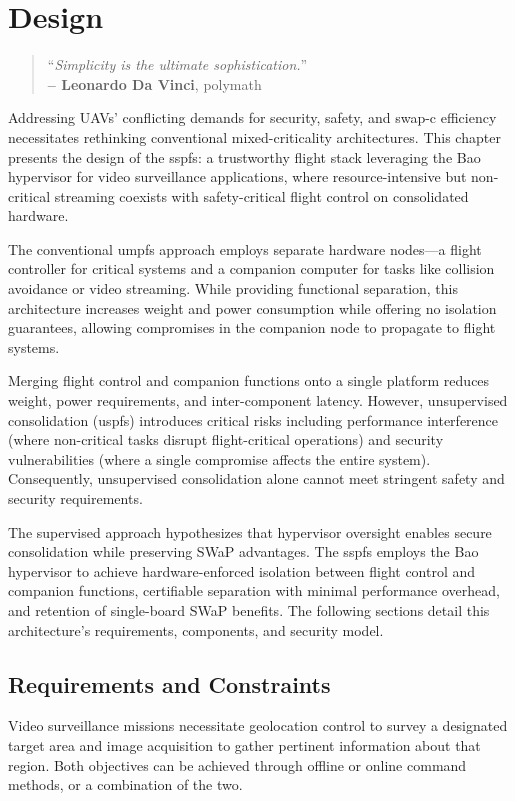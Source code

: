 %
\chapter{Design}%
\label{ch:design}
\begin{quote}
\begin{flushright}
``\emph{Simplicity is the ultimate sophistication.}'' \\
\textbf{-- Leonardo Da Vinci}, polymath
\end{flushright}
\end{quote}

Addressing UAVs' conflicting demands for security, safety, and \gls{swap-c} efficiency necessitates rethinking conventional mixed-criticality architectures. This chapter presents the design of the \gls{sspfs}: a trustworthy flight stack leveraging the Bao hypervisor for video surveillance applications, where resource-intensive but non-critical streaming coexists with safety-critical flight control on consolidated hardware.

The conventional \gls{umpfs} approach employs separate hardware nodes—a flight controller for critical systems and a companion computer for tasks like collision avoidance or video streaming. While providing functional separation, this architecture increases weight and power consumption while offering no isolation guarantees, allowing compromises in the companion node to propagate to flight systems.

Merging flight control and companion functions onto a single platform reduces weight, power requirements, and inter-component latency. However, unsupervised consolidation (\gls{uspfs}) introduces critical risks including performance interference (where non-critical tasks disrupt flight-critical operations) and security vulnerabilities (where a single compromise affects the entire system). Consequently, unsupervised consolidation alone cannot meet stringent safety and security requirements.

The supervised approach hypothesizes that hypervisor oversight enables secure consolidation while preserving SWaP advantages. The \gls{sspfs} employs the Bao hypervisor to achieve hardware-enforced isolation between flight control and companion functions, certifiable separation with minimal performance overhead, and retention of single-board SWaP benefits. The following sections detail this architecture's requirements, components, and security model.

\section{Requirements and Constraints}
\label{sec:req-sec}
Video surveillance missions necessitate geolocation control to survey a
designated target area and image acquisition to gather pertinent information
about that region. Both objectives can be achieved through offline or online
command methods, or a combination of the two.

